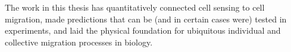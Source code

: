 The work in this thesis has quantitatively connected cell sensing to cell migration, made predictions that can be (and in certain cases were) tested in experiments, and laid the physical foundation for ubiquitous individual and collective migration processes in biology.

